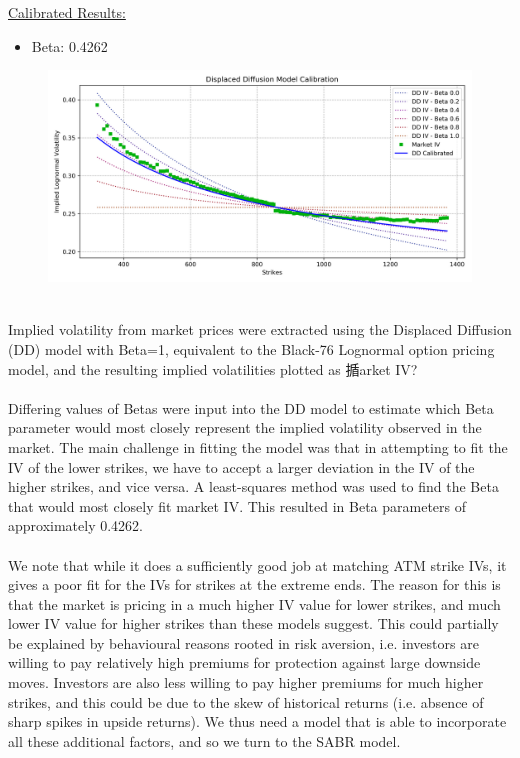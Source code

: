 \documentclass{article}
\begin{document}
\underline{Calibrated Results:}
\begin{itemize}
	\item Beta: 0.4262
\end{itemize}

\begin{figure}[ht]
	\centering
	\includegraphics[width= \linewidth]{DD.png}
\end{figure}
\noindent\\
Implied volatility from market prices were extracted using the Displaced Diffusion (DD) model with Beta=1, equivalent to the Black-76 Lognormal option pricing model, and the resulting implied volatilities plotted as 揗arket IV?\\
\noindent\\
Differing values of Betas were input into the DD model to estimate which Beta parameter would most closely represent the implied volatility observed in the market. The main challenge in fitting the model was that in attempting to fit the IV of the lower strikes, we have to accept a larger deviation in the IV of the higher strikes, and vice versa. A least-squares method was used to find the Beta that would most closely fit market IV. This resulted in Beta parameters of approximately 0.4262.\\
\noindent\\
We note that while it does a sufficiently good job at matching ATM strike IVs, it gives a poor fit for the IVs for strikes at the extreme ends. The reason for this is that the market is pricing in a much higher IV value for lower strikes, and much lower IV value for higher strikes than these models suggest. This could partially be explained by behavioural reasons rooted in risk aversion, i.e. investors are willing to pay relatively high premiums for protection against large downside moves. Investors are also less willing to pay higher premiums for much higher strikes, and this could be due to the skew of historical returns (i.e. absence of sharp spikes in upside returns). We thus need a model that is able to incorporate all these additional factors, and so we turn to the SABR model. \\
\end{document}
